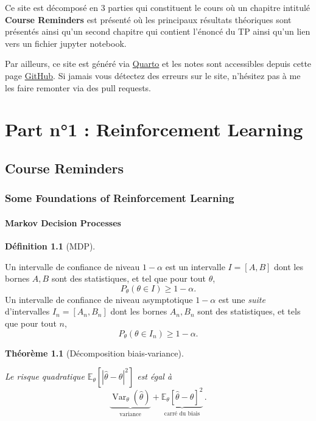 \documentclass[
  10,
  letterpaper,
  DIV=11,
  numbers=noendperiod]{scrreport}
\theoremstyle{definition}
\newtheorem{definition}{Définition}[chapter]
\theoremstyle{definition}
\theoremstyle{plain}
\newtheorem{theorem}{Théorème}[chapter]
\theoremstyle{remark}
\begin{document}

Ce site est décomposé en 3 parties qui constituent le cours où un
chapitre intitulé \textbf{Course Reminders} est présenté où les
principaux résultats théoriques sont présentés ainsi qu'un second
chapitre qui contient l'énoncé du TP ainsi qu'un lien vers un fichier
jupyter notebook.

Par ailleurs, ce site est généré via \href{https://quarto.org}{Quarto}
et les notes sont accessibles depuis cette page
\href{https://github.com/SamyMekk/TP-Controle-Stochastique}{GitHub}. Si
jamais vous détectez des erreurs sur le site, n'hésitez pas à me les
faire remonter via des pull requests.

\part{Part n°1 : Reinforcement Learning}

\chapter{Course Reminders}\label{course-reminders}

\section{Some Foundations of Reinforcement
Learning}\label{some-foundations-of-reinforcement-learning}

\subsection{Markov Decision Processes}\label{markov-decision-processes}

\begin{definition}[MDP]\protect\hypertarget{def-MDP}{}\label{def-MDP}

Un intervalle de confiance de niveau \(1-\alpha\) est un intervalle
\(I = [A,B]\) dont les bornes \(A,B\) sont des statistiques, et tel que
pour tout \(\theta\), \[P_\theta(\theta \in I) \geqslant 1 - \alpha.\]
Un intervalle de confiance de niveau asymptotique \(1-\alpha\) est une
\emph{suite} d'intervalles \(I_n = [A_n,B_n]\) dont les bornes
\(A_n,B_n\) sont des statistiques, et tels que pour tout \(n\),
\[ P_\theta(\theta \in I_n) \geqslant 1 - \alpha.\]

\end{definition}

\begin{theorem}[Décomposition
biais-variance]\protect\hypertarget{thm-biaisvar}{}\label{thm-biaisvar}

Le risque quadratique \(\mathbb{E}_{\theta} [|\hat{\theta}-\theta|^2]\)
est égal à \[
\underbrace{\operatorname{Var}_{\theta} (\hat{\theta})}_{\text{variance}} +
\underbrace{\mathbb{E}_{\theta}[\hat{\theta}-\theta]^2}_{\text{carré du biais}} \, .
\]

\end{theorem}
\end{document}
